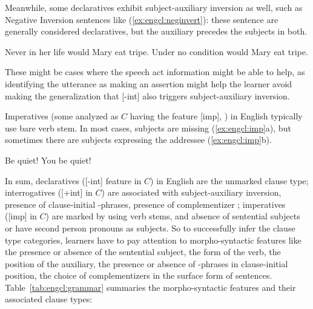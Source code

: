 Meanwhile, some declaratives exhibit subject-auxiliary inversion as well, such as Negative Inversion sentences like (\ref{ex:engcl:neginvert}): these sentence are generally considered declaratives, but the auxiliary  precedes the subjects in both.

\bxl{}
Never in her life would Mary eat tripe.
\ex
Under no condition would Mary eat tripe.
\exl
\eex

These might be cases where the speech act information might be able to help, as identifying the utterance as making an assertion might help the learner avoid making the generalization that [-int] also triggers subject-auxiliary inversion. 

Imperatives (some analyzed as $C$ having the feature [imp], \cite{platzack1997imp}) in English typically use bare verb stem. In most cases, subjects are missing (\ref{ex:engcl:imp}a), but sometimes there are subjects expressing the addressee (\ref{ex:engcl:imp}b).

\bxl{}
Be quiet!
\ex You be quiet!
\exl
\eex


In sum, declaratives ([-int] feature in $C$) in English are the unmarked clause type; interrogatives ([+int] in $C$) are associated with subject-auxiliary inversion, presence of clause-initial \twh-phrases, presence of complementizer ; imperatives ([imp] in $C$) are marked by using verb stems, and absence of sentential subjects or have second person pronouns as subjects. So to successfully infer the clause type categories, learners have to pay attention to morpho-syntactic features like the presence or absence of the sentential subject, the form of the verb, the position of the auxiliary, the presence or absence of \twh-phrases in clause-initial position, the choice of complementizers in the surface form of sentences. Table~\ref{tab:engcl:grammar} summaries the morpho-syntactic features and their associated clause types:


